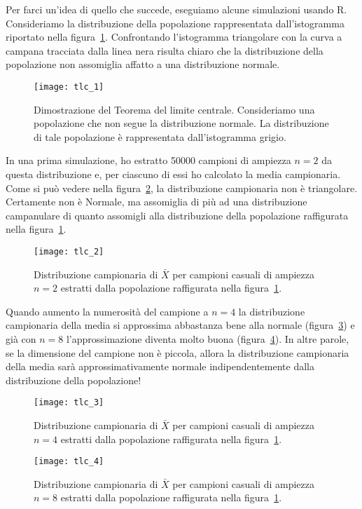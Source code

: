Per farci un'idea di quello che succede, eseguiamo alcune simulazioni usando R. 
Consideriamo la distribuzione della popolazione rappresentata dall'istogramma riportato nella figura~\ref{fig:tlc_1}. 
Confrontando l'istogramma triangolare con la curva a campana tracciata dalla linea nera risulta chiaro che la distribuzione della popolazione non assomiglia affatto a una distribuzione normale. 

\begin{figure}[h!]
\centering
\texttt{[image: tlc\_1]}
\caption{Dimostrazione del Teorema del limite centrale. Consideriamo una popolazione che non segue la distribuzione normale. La distribuzione di tale popolazione è rappresentata dall'istogramma grigio.
}
\label{fig:tlc_1}
\end{figure}

In una prima simulazione, ho estratto \num{50000} campioni di ampiezza $n=2$ da questa distribuzione e, per ciascuno di essi ho calcolato la media campionaria.
Come si può vedere nella figura~\ref{fig:tlc_2}, la distribuzione campionaria non è triangolare.
Certamente non è Normale, ma assomiglia di più ad una distribuzione campanulare di quanto assomigli alla distribuzione della popolazione raffigurata nella figura~\ref{fig:tlc_1}.

\begin{figure}[h!]
\centering
\texttt{[image: tlc\_2]}
\caption{
Distribuzione campionaria di $\bar{X}$ per campioni casuali di ampiezza $n=2$ estratti dalla popolazione raffigurata nella figura~\ref{fig:tlc_1}.
}
\label{fig:tlc_2}
\end{figure}

Quando aumento la numerosità del campione a $n=4$ la distribuzione campionaria della media si approssima abbastanza bene alla normale (figura~\ref{fig:tlc_3}) e già con  $n=8$ l'approssimazione diventa molto buona (figura~\ref{fig:tlc_4}). 
In altre parole, se la dimensione del campione non è piccola, allora la distribuzione campionaria della media sarà approssimativamente normale indipendentemente dalla distribuzione della popolazione!

\begin{figure}[h!]
\centering
\texttt{[image: tlc\_3]}
\caption{
Distribuzione campionaria di $\bar{X}$ per campioni casuali di ampiezza $n=4$ estratti dalla popolazione raffigurata nella figura~\ref{fig:tlc_1}.
}
\label{fig:tlc_3}
\end{figure}

\begin{figure}[h!]
\centering
\texttt{[image: tlc\_4]}
\caption{
Distribuzione campionaria di $\bar{X}$ per campioni casuali di ampiezza $n=8$ estratti dalla popolazione raffigurata nella figura~\ref{fig:tlc_1}.
}
\label{fig:tlc_4}
\end{figure}

